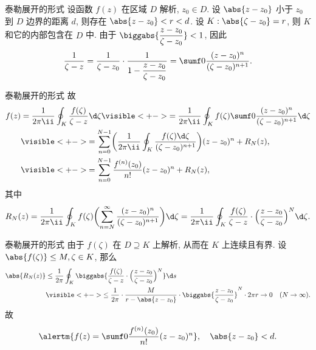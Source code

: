 \begin{frame}{泰勒展开的形式\noexer}
	\onslide<+->
	设函数 $f(z)$ 在区域 $D$ 解析, $z_0\in D$.
	\onslide<+->
	设 $\abs{z-z_0}$ 小于 $z_0$ 到 $D$ 边界的距离 $d$,
	则存在 $\abs{z-z_0}<r<d$.
	\onslide<+->
	设 $K:\abs{\zeta-z_0}=r$, 则 $K$ 和它的内部包含在 $D$ 中.
	\onslide<+->
	由于 $\biggabs{\dfrac{z-z_0}{\zeta-z_0}}<1$, 因此
	\[
		\frac1{\zeta-z}
		=\frac1{\zeta-z_0}\cdot\frac1{1-\dfrac{z-z_0}{\zeta-z_0}}
		=\sumf0\frac{(z-z_0)^n}{(\zeta-z_0)^{n+1}}.
	\]
	\onslide<1->
	\begin{center}
	\end{center}
\end{frame}


\begin{frame}{泰勒展开的形式\noexer}
	\onslide<+->
	故
	\begin{align*}
		f(z)&=\frac1{2\pi\ii}\oint_K \frac{f(\zeta)}{\zeta-z}\d\zeta
		\visible<+->{=\frac1{2\pi\ii}\oint_K f(\zeta)\sumf0\frac{(z-z_0)^n}{(\zeta-z_0)^{n+1}}\d\zeta}\\
		&\visible<+->{=
		\sum_{n=0}^{N-1}\biggl(\frac1{2\pi\ii}\oint_K\frac{f(\zeta)\d\zeta}{(\zeta-z_0)^{n+1}}\biggr)(z-z_0)^n+R_N(z),}\\
		&\visible<+->{=
		\sum_{n=0}^{N-1}\frac{f^{(n)}(z_0)}{n!}(z-z_0)^n+R_N(z),}
	\end{align*}
	\onslide<+->
	其中
	\[
		R_N(z)=\frac1{2\pi\ii}\oint_Kf(\zeta)\biggl(\sum_{n=N}^\infty\frac{(z-z_0)^n}{(\zeta-z_0)^{n+1}}\biggr)\d\zeta
		=\frac1{2\pi\ii}\oint_K\frac{f(\zeta)}{\zeta-z}\cdot\Bigl(\frac{z-z_0}{\zeta-z_0}\Bigr)^N\d\zeta.
	\]
\end{frame}


\begin{frame}{泰勒展开的形式}
	\onslide<+->
	由于 $f(\zeta)$ 在 $D\supseteq K$ 上解析, 从而在 $K$ 上连续且有界.
	\onslide<+->
	设 $\abs{f(\zeta)}\le M,\zeta\in K$,
	\onslide<+->
	那么
	\begin{align*}
		\abs{R_N(z)}&\le\frac 1{2\pi}\oint_K\biggabs{\frac{f(\zeta)}{\zeta-z}\cdot\Bigl(\frac{z-z_0}{\zeta-z_0}\Bigr)^N}\d s\\
		&\visible<+->{\le\frac 1{2\pi}\cdot \frac M{r-\abs{z-z_0}}\cdot\biggabs{\frac{z-z_0}{\zeta-z_0}}^N\cdot 2\pi r\to 0\quad (N\to\infty).}
	\end{align*}
	\onslide<+->
	故
	\[
		\alertm{f(z)=\sumf0\frac{f^{(n)}(z_0)}{n!}(z-z_0)^n},\quad \abs{z-z_0}<d.
	\]
\end{frame}


